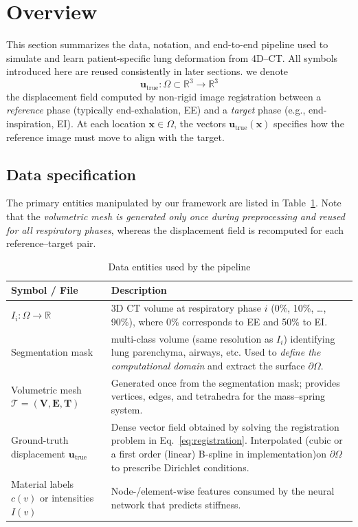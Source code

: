 \documentclass{article}
\begin{document}
\section{Overview}

This section summarizes the data, notation, and end-to-end pipeline used to simulate and learn patient-specific lung deformation from 4D--CT. All symbols introduced here are reused consistently in later sections.
\newline
we denote 
\[
  \mathbf{u}_{\mathrm{true}} \colon \Omega \subset \mathbb{R}^3 \to \mathbb{R}^3
\]
the displacement field computed by non-rigid image registration between a \emph{reference} phase (typically end-exhalation, EE) and a \emph{target} phase (e.g., end-inspiration, EI). At each location $\mathbf{x}\in\Omega$, the vectors $\mathbf{u}_{\mathrm{true}}(\mathbf{x})$ specifies how the reference image must move to align with the target.

\subsection{Data specification}
\label{data-spec}

The primary entities manipulated by our framework are listed in Table~\ref{tab:data}. Note that the \emph{volumetric mesh is generated only once during preprocessing and reused for all respiratory phases}, whereas the displacement field is recomputed for each reference–target pair.

\begin{table}[h!]
\centering
\caption{Data entities used by the pipeline}
\label{tab:data}
\begin{tabular}{@{}lp{10cm}@{}}
\toprule
\textbf{Symbol / File} & \textbf{Description} \\
\midrule
$I_i\colon \Omega \to \mathbb{R}$ & 3D CT volume at respiratory phase $i$ (0\%, 10\%, \dots, 90\%), where 0\% corresponds to EE and 50\% to EI. \\[0.6em]
Segmentation mask & multi-class volume (same resolution as $I_i$) identifying lung parenchyma, airways, etc. Used to \emph{define the computational domain} and extract the surface $\partial\Omega$. \\[0.6em]
Volumetric mesh $\mathcal{T}=(\mathbf{V},\mathbf{E},\mathbf{T})$ & Generated once from the segmentation mask; provides vertices, edges, and tetrahedra for the mass–spring system. \\[0.6em]
Ground-truth displacement $\mathbf{u}_{\mathrm{true}}$ & Dense vector field obtained by solving the registration problem in Eq.~\eqref{eq:registration}. Interpolated (cubic or a first order (linear) B-spline in implementation)on $\partial\Omega$ to prescribe Dirichlet conditions. \\[0.6em]
Material labels $c(v)$ or intensities $I(v)$ & Node-/element-wise features consumed by the neural network that predicts stiffness. \\
\bottomrule
\end{tabular}
\end{table}
\end{document}
